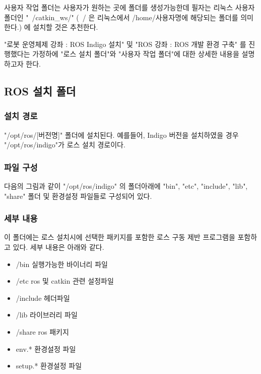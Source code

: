 사용자 작업 폴더는 사용자가 원하는 곳에 폴더를 생성가능한데 필자는 리눅스 사용자 폴더인 "~/catkin\_ws/" (~/ 은 리눅스에서 /home/사용자명에 해당되는 폴더를 의미한다.) 에 설치할 것은 추천한다. 

"로봇 운영체제 강좌 : ROS Indigo 설치" 및 "ROS 강좌 : ROS 개발 환경 구축" 를 진행했다는 가정하에 "로스 설치 폴더"와 "사용자 작업 폴더"에 대한 상세한 내용을 설명하고자 한다.


\subsection{ROS 설치 폴더}

\subsubsection{설치 경로}

"/opt/ros/[버전명]" 폴더에 설치된다. 예를들어, Indigo 버전을 설치하였을 경우 "/opt/ros/indigo"가 로스 설치 경로이다.

\subsubsection{파일 구성}

다음의 그림과 같이 "/opt/ros/indigo" 의 폴더아래에 "bin", "etc", "include", "lib", "share" 폴더 및 환경설정 파일들로 구성되어 있다. 

\subsubsection{세부 내용}

이 폴더에는 로스 설치시에 선택한 패키지를 포함한 로스 구동 제반 프로그램을 포함하고 있다. 세부 내용은 아래와 같다.

\begin{itemize}
\item /bin 실행가능한 바이너리 파일
\item /etc ros 및 catkin 관련 설정파일
\item /include 헤더파일
\item /lib 라이브러리 파일
\item /share ros 패키지
\item env.* 환경설정 파일
\item setup.* 환경설정 파일
\end{itemize}


